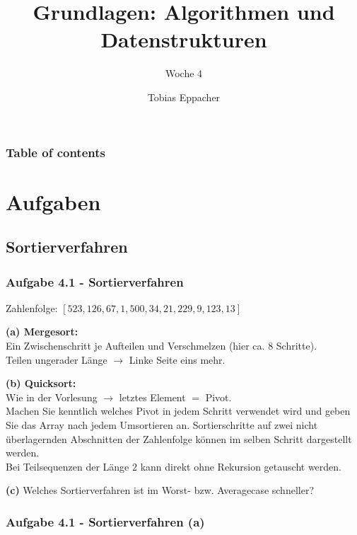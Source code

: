 \documentclass{beamer}
\title{Grundlagen: Algorithmen und Datenstrukturen}
\author{Tobias Eppacher}
\date{\presdatum}
\institute{School of Computation, Information and Technology}
\subtitle{Woche 4}
\begin{document}
\begin{frame}
	\titlepage{}
\end{frame}

\begin{frame}
	\frametitle{Table of contents}
	\tableofcontents[subsectionstyle=hide]
\end{frame}

\section{Aufgaben}

\subsection{Sortierverfahren}
\begin{frame}
	\frametitle{Aufgabe 4.1 - Sortierverfahren}
	Zahlenfolge: $[523, 126, 67, 1, 500, 34, 21, 229, 9, 123, 13]$

	\smallskip

	\textbf{(a) Mergesort:} \\
	Ein Zwischenschritt je Aufteilen und Verschmelzen (hier ca. 8 Schritte). \\
	Teilen ungerader Länge $\rightarrow$ Linke Seite eins mehr.

	\smallskip

	\textbf{(b) Quicksort:} \\
	Wie in der Vorlesung $\rightarrow$ letztes Element $=$ Pivot. \\
	Machen Sie kenntlich welches Pivot in jedem Schritt verwendet wird und geben
	Sie das Array nach jedem Umsortieren an.
	Sortierschritte auf zwei nicht überlagernden Abschnitten der Zahlenfolge
	können im selben Schritt dargestellt werden. \\
	Bei Teilsequenzen der Länge 2 kann direkt ohne Rekursion getauscht werden.

	\smallskip

	\textbf{(c)} Welches Sortierverfahren ist im Worst- bzw. Averagecase schneller?
\end{frame}

\begin{frame}[t]
	\frametitle{Aufgabe 4.1 - Sortierverfahren (a)}
\end{frame}
\end{document}
